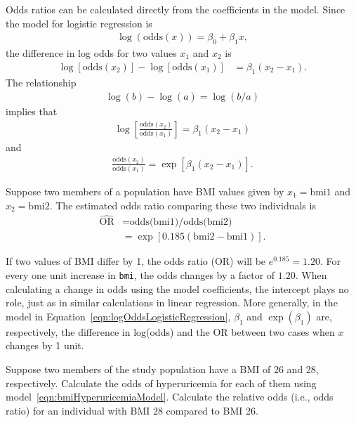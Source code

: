 

Odds ratios can be calculated directly from the coefficients in the model. Since the model for logistic regression is
\begin{align*}
  \log(\text{odds}(x)) = \beta_0 + \beta_1 x,
\end{align*}
the difference in log odds for two values $x_1$ and $x_2$ is
\begin{align*}
  \log[\text{odds}(x_2)] - \log[\text{odds}(x_1)] &= \beta_1(x_2 - x_1).
\end{align*}
The relationship
\begin{align*}
  \log(b) - \log(a) = \log(b/a)
\end{align*}
implies that
\begin{align*}
  \log\left[\frac{\text{odds}(x_2)}{\text{odds}(x_1)}\right] = \beta_1(x_2 - x_1)
\end{align*}
and
\begin{align}
  \frac{\text{odds}(x_2)}{\text{odds}(x_1)} = \exp[\beta_1(x_2 - x_1)].
  \label{eqn:oddsRatioLogisticRegression}
\end{align}

Suppose two members of a population have BMI values given by $x_1=\text{bmi1}$ and $x_2 = \text{bmi2}$. The estimated odds ratio comparing these two individuals is
\begin{align*}
  \widehat{\text{OR}} &= \text{odds(bmi1)/odds(bmi2)} \\
  &= \exp[0.185(\text{bmi2} - \text{bmi1})].
\end{align*}

If two values of BMI differ by 1, the odds ratio (OR) will be $e^{0.185} = 1.20$. For every one unit increase in \texttt{bmi}, the odds changes by a factor of $1.20$. When calculating a change in odds using the model coefficients, the intercept plays no role, just as in similar calculations in linear regression.  More generally, in the model in Equation~\ref{eqn:logOddsLogisticRegression}, $\beta_1$ and $\exp(\beta_1)$ are, respectively, the difference in log(odds) and the OR between two cases when $x$ changes by 1 unit.

\begin{exercisewrap}
\begin{nexercise}
  Suppose two members of the study population have a BMI of 26 and 28, respectively.  Calculate the odds of hyperuricemia for each of them using
model~\ref{eqn:bmiHyperuricemiaModel}.  Calculate the relative odds (i.e., odds ratio) for an individual with BMI 28 compared to BMI 26.
\footnotemark{}
\end{nexercise}
\end{exercisewrap}


